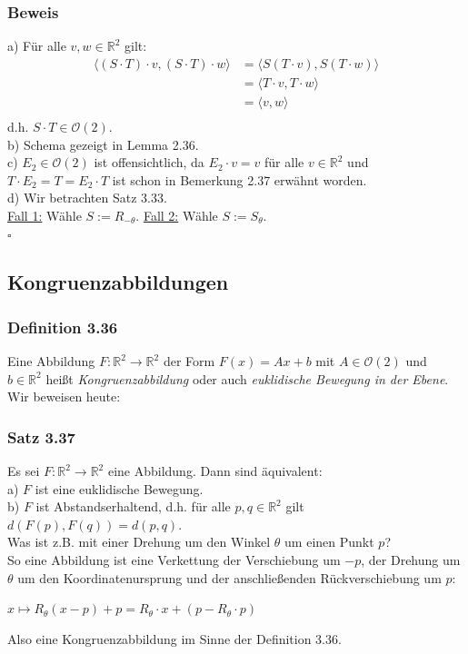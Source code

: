 \documentclass{article}
\begin{document}
\subsubsection*{Beweis}
a) Für alle $v,w \in \mathbb{R}^2$ gilt: \\
\begin{align*}
    \langle (S \cdot T) \cdot v, (S \cdot T) \cdot w \rangle &= \langle S (T \cdot v), S (T \cdot w) \rangle \\
    &= \langle T \cdot v, T \cdot w \rangle \\
    &= \langle v,w \rangle \\
\end{align*}
d.h. $S \cdot T \in \mathcal{O}(2)$. \\
b) Schema gezeigt in Lemma 2.36. \\
c) $E_2 \in \mathcal{O}(2)$ ist offensichtlich, da $E_2 \cdot v = v$ für alle $v \in \mathbb{R}^2$ und $T \cdot E_2 = T = E_2 \cdot T$ ist schon in Bemerkung 2.37 erwähnt worden. \\
d) Wir betrachten Satz 3.33. \\
\underline{Fall 1:} Wähle $S := R_{-\theta}$. 
\underline {Fall 2:} Wähle $S := S_\theta$. \\
$\square$ \\

\newpage
\subsection{Kongruenzabbildungen}
\subsubsection*{Definition 3.36}
Eine Abbildung $F: \mathbb{R}^2 \rightarrow \mathbb{R}^2$ der Form $F(x)=Ax+b$ mit $A \in \mathcal{O}(2)$ und $b \in \mathbb{R}^2$ heißt \textit{Kongruenzabbildung} oder auch \textit{euklidische Bewegung in der Ebene}. \\
Wir beweisen heute: \\
\subsubsection*{Satz 3.37}
Es sei $F: \mathbb{R}^2 \rightarrow \mathbb{R}^2$ eine Abbildung. Dann sind äquivalent: \\
a) $F$ ist eine euklidische Bewegung. \\
b) $F$ ist Abstandserhaltend, d.h. für alle $p,q \in \mathbb{R}^2$ gilt $d(F(p),F(q)) = d(p,q)$. \\
Was ist z.B. mit einer Drehung um den Winkel $\theta$ um einen Punkt $p$? \\
So eine Abbildung ist eine Verkettung der Verschiebung um $-p$, der Drehung um $\theta$ um den Koordinatenursprung und der anschließenden Rückverschiebung um $p$: \\
\begin{center}
    $x \mapsto R_\theta (x-p)+p = R_\theta \cdot x + (p-R_\theta \cdot p)$ \\
\end{center}
Also eine Kongruenzabbildung im Sinne der Definition 3.36. \\
\\
\end{document}
